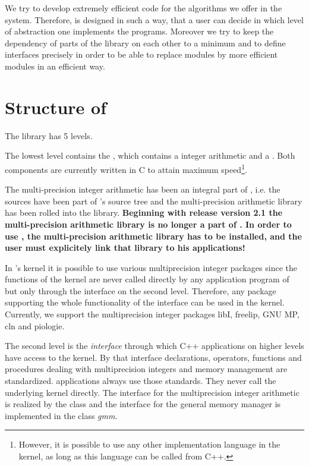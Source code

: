 We try to develop extremely efficient code for the algorithms we offer in the \LiDIA system.
Therefore, \LiDIA is designed in such a way, that a user can decide in which level of
abstraction one implements the programs.  Moreover we try to keep the dependency of parts of the
library on each other to a minimum and to define interfaces precisely in order to be able to
replace modules by more efficient modules in an efficient way.

\section{Structure of \LiDIA}

The \LiDIA library has 5 levels.

The lowest level contains the , which contains a  integer
arithmetic and a .  Both components are currently written in C to attain
maximum speed\footnote{However, it is possible to use any other implementation language in the
  kernel, as long as this language can be called from C++.}.

\attentionIII The multi-precision integer arithmetic has been an integral part of \LiDIA, i.e.
the sources have been part of \LiDIA's source tree and the multi-precision arithmetic library
has been rolled into the \LiDIA library.  \textbf{Beginning with release version 2.1 the
  multi-precision arithmetic library is no longer a part of \LiDIA.  In order to use \LiDIA, the
  multi-precision arithmetic library has to be installed, and the user must explicitely link
  that library to his applications!}

In \LiDIA's kernel it is possible to use various multiprecision integer packages since the
functions of the kernel are never called directly by any application program of \LiDIA but only
through the interface on the second level.  Therefore, any package supporting the whole
functionality of the interface can be used in the kernel.  Currently, we support the
multiprecision integer packages libI, freelip, GNU MP, cln and piologie.

The second \LiDIA level is the \emph{interface} through which C++ applications on higher
levels have access to the kernel.  By that interface declarations, operators, functions and
procedures dealing with multiprecision integers and memory management are standardized.  \LiDIA
applications always use those standards.  They never call the underlying kernel directly.  The
interface for the multiprecision integer arithmetic is realized by the class  and
the interface for the general memory manager is implemented in the class \emph{gmm}.

